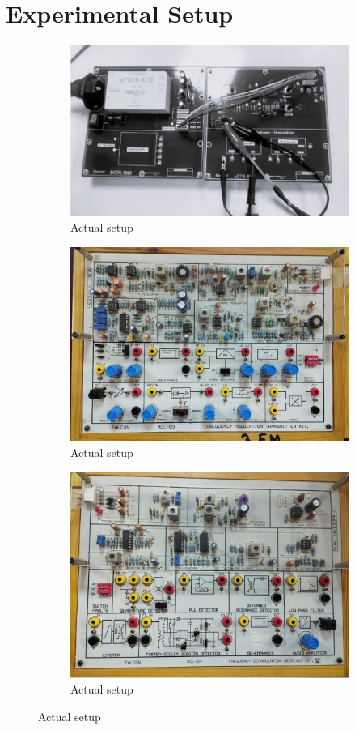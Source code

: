 \documentclass[a4paper,12pt]{article}
\begin{document}
	\section{Experimental Setup}
	\begin{figure}[H]
		\centering
		
		
		\begin{subfigure}[t]{0.81\textwidth}
			\centering
			\includegraphics[width=0.85\linewidth]{Images/4.1}
			\caption{ Actual setup}
		\end{subfigure}
			\begin{subfigure}[t]{0.81\textwidth}
			\centering
			\includegraphics[width=0.85\linewidth]{Images/13}
			\caption{ Actual setup}
		\end{subfigure}
		\begin{subfigure}[t]{0.81\textwidth}
			\centering
			\includegraphics[width=0.85\linewidth]{Images/14}
			\caption{ Actual setup}
		\end{subfigure}
	\end{figure}
	
\end{document}
